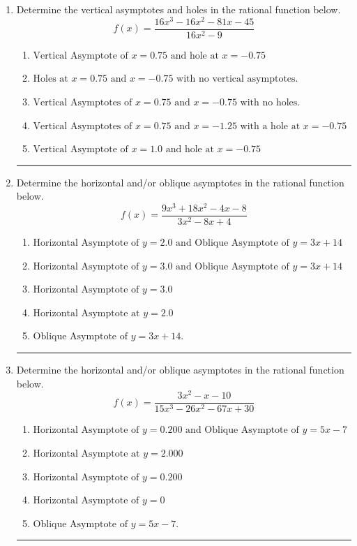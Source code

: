 \documentclass[14pt]{extbook}
\newcommand{\litem}[1]{\item#1\hspace*{-1cm}\rule{\textwidth}{0.4pt}}
\begin{document}
\begin{enumerate}
{\begin{enumerate}[label=\Alph*.]
\end{enumerate} }
\litem{
Determine the vertical asymptotes and holes in the rational function below.\[ f(x) = \frac{16x^{3} -16 x^{2} -81 x -45}{16x^{2} -9} \]\begin{enumerate}[label=\Alph*.]
\item \( \text{Vertical Asymptote of } x = 0.75 \text{ and hole at } x = -0.75 \)
\item \( \text{Holes at } x = 0.75 \text{ and } x = -0.75 \text{ with no vertical asymptotes.} \)
\item \( \text{Vertical Asymptotes of } x = 0.75 \text{ and } x = -0.75 \text{ with no holes.} \)
\item \( \text{Vertical Asymptotes of } x = 0.75 \text{ and } x = -1.25 \text{ with a hole at } x = -0.75 \)
\item \( \text{Vertical Asymptote of } x = 1.0 \text{ and hole at } x = -0.75 \)

\end{enumerate} }
\litem{
Determine the horizontal and/or oblique asymptotes in the rational function below.\[ f(x) = \frac{9x^{3} +18 x^{2} -4 x -8}{3x^{2} -8 x + 4} \]\begin{enumerate}[label=\Alph*.]
\item \( \text{Horizontal Asymptote of } y = 2.0 \text{ and Oblique Asymptote of } y = 3x + 14 \)
\item \( \text{Horizontal Asymptote of } y = 3.0 \text{ and Oblique Asymptote of } y = 3x + 14 \)
\item \( \text{Horizontal Asymptote of } y = 3.0  \)
\item \( \text{Horizontal Asymptote at } y = 2.0 \)
\item \( \text{Oblique Asymptote of } y = 3x + 14. \)

\end{enumerate} }
\litem{
Determine the horizontal and/or oblique asymptotes in the rational function below.\[ f(x) = \frac{3x^{2} -x -10}{15x^{3} -26 x^{2} -67 x + 30} \]\begin{enumerate}[label=\Alph*.]
\item \( \text{Horizontal Asymptote of } y = 0.200 \text{ and Oblique Asymptote of } y = 5x -7 \)
\item \( \text{Horizontal Asymptote at } y = 2.000 \)
\item \( \text{Horizontal Asymptote of } y = 0.200  \)
\item \( \text{Horizontal Asymptote of } y = 0 \)
\item \( \text{Oblique Asymptote of } y = 5x -7. \)


\end{enumerate}}
\end{enumerate}
\end{document}
